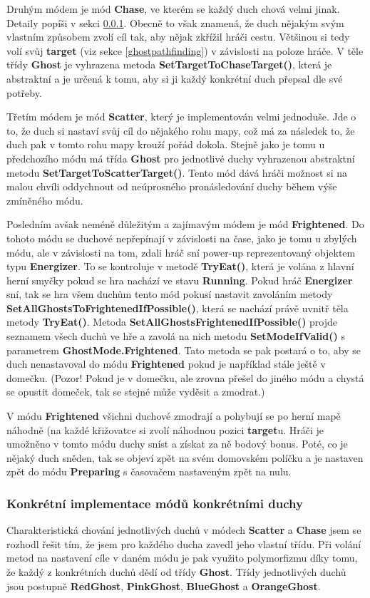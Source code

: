 \documentclass[a4]{article}
\begin{document}
Druhým módem je mód \textbf{Chase}, ve kterém se každý duch chová velmi jinak. Detaily popíši v sekci \ref{concretemodes}. Obecně to však znamená, že duch nějakým svým vlastním způsobem zvolí cíl tak, aby nějak zkřížil hráči cestu. Většinou si tedy volí svůj \textbf{target} (viz sekce \ref{ghostpathfinding}) v závislosti na poloze hráče. V těle třídy \textbf{Ghost} je vyhrazena metoda \textbf{SetTargetToChaseTarget()}, která je abstraktní a je určená k tomu, aby si ji každý konkrétní duch přepsal dle své potřeby.

Třetím módem je mód \textbf{Scatter}, který je implementován velmi jednoduše. Jde o to, že duch si nastaví svůj cíl do nějakého rohu mapy, což má za následek to, že duch pak v tomto rohu mapy krouží pořád dokola. Stejně jako je tomu u předchozího módu má třída \textbf{Ghost} pro jednotlivé duchy vyhrazenou abstraktní metodu \textbf{SetTargetToScatterTarget()}. Tento mód dává hráči možnost si na malou chvíli oddychnout od neúprosného pronásledování duchy během výše zmíněného módu.

Posledním avšak neméně důležitým a zajímavým módem je mód \textbf{Frightened}. Do tohoto módu se duchové nepřepínají v závislosti na čase, jako je tomu u zbylých módu, ale v závislosti na tom, zdali hráč sní power-up reprezentovaný objektem typu \textbf{Energizer}. To se kontroluje v metodě \textbf{TryEat()}, která je volána z hlavní herní smyčky pokud se hra nachází ve stavu \textbf{Running}. Pokud hráč \textbf{Energizer} sní, tak se hra všem duchům tento mód pokusí nastavit zavoláním metody \textbf{SetAllGhostsToFrightenedIfPossible()}, která se nachází právě uvnitř těla metody \textbf{TryEat()}. Metoda \textbf{SetAllGhostsFrightenedIfPossible()} projde seznamem všech duchů ve hře a zavolá na nich metodu \textbf{SetModeIfValid()} s parametrem \textbf{GhostMode.Frightened}. Tato metoda se pak postará o to, aby se duch nenastavoval do módu \textbf{Frightened} pokud je například stále ještě v domečku. (Pozor! Pokud je v domečku, ale zrovna přešel do jiného módu a chystá se opustit domeček, tak se stejné může vyděsit a zmodrat.)

V módu \textbf{Frightened} všichni duchové zmodrají a pohybují se po herní mapě náhodně (na každé křižovatce si zvolí náhodnou pozici \textbf{target}u. Hráči je umožněno v tomto módu duchy sníst a získat za ně bodový bonus. Poté, co je nějaký duch sněden, tak se objeví zpět na svém domovském políčku a je nastaven zpět do módu \textbf{Preparing} s časovačem nastaveným zpět na nulu.

\subsubsection{Konkrétní implementace módů konkrétními duchy} \label{concretemodes}
Charakteristická chování jednotlivých duchů v módech \textbf{Scatter} a \textbf{Chase} jsem se rozhodl řešit tím, že jsem pro každého ducha zavedl jeho vlastní třídu. Při volání metod na nastavení cíle v daném módu je pak využito polymorfizmu díky tomu, že každý z konkrétních duchů dědí od třídy \textbf{Ghost}. Třídy jednotlivých duchů jsou postupně \textbf{RedGhost}, \textbf{PinkGhost}, \textbf{BlueGhost} a \textbf{OrangeGhost}. 
\end{document}
